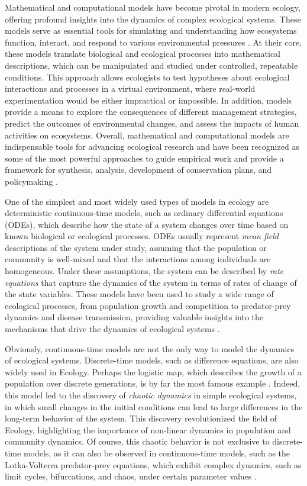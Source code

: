 Mathematical and computational models have become pivotal in modern ecology,
offering profound insights into the dynamics of complex ecological systems.
These models serve as essential tools for simulating and understanding how
ecosystems function, interact, and respond to various environmental pressures
\cite{HOCH19983}. At their core, these models translate biological and
ecological processes into mathematical descriptions, which can be manipulated
and studied under controlled, repeatable conditions. This approach allows
ecologists to test hypotheses about ecological interactions and processes in a
virtual environment, where real-world experimentation would be either
impractical or impossible. In addition, models provide a means to explore the
consequences of different management strategies, predict the outcomes of
environmental changes, and assess the impacts of human activities on
ecosystems. Overall, mathematical and computational models are indispensable
tools for advancing ecological research and have been recognized as some
of the most powerful approaches to guide empirical work and provide a framework
for synthesis, analysis, development of conservation plans, and policymaking
\cite{levin1992mathematics,Murray_book,sarkar2006biodiversity}.

One of the simplest and most widely used types of models in ecology are
deterministic continuous-time models, such as ordinary differential equations
(ODEs), which describe how the state of a system changes over time based on
known biological or ecological processes. ODEs usually represent \textit{mean
  field} descriptions of the system under study, assuming that the population
or community is well-mixed and that the interactions among individuals are
homogeneous. Under these assumptions, the system can be described by
\textit{rate equations} that capture the dynamics of the system in terms of
rates of change of the state variables. These models have been used to study a
wide range of ecological processes, from population growth and competition to
predator-prey dynamics and disease transmission, providing valuable insights
into the mechanisms that drive the dynamics of ecological systems
\cite{Murray_book}.

Obviously, continuous-time models are not the only way to model the dynamics of
ecological systems. Discrete-time models, such as difference equations, are
also widely used in Ecology. Perhaps the logistic map, which describes the
growth of a population over discrete generations, is by far the most famous
example \cite{May1974}. Indeed, this model led to the discovery of
\textit{chaotic dynamics} in simple ecological systems, in which small changes
in the initial conditions can lead to large differences in the long-term
behavior of the system. This discovery revolutionized the field of Ecology,
highlighting the importance of non-linear dynamics in population and community
dynamics. Of course, this chaotic behavior is not exclusive to discrete-time
models, as it can also be observed in continuous-time models, such as the
Lotka-Volterra predator-prey equations, which exhibit complex dynamics, such as
limit cycles, bifurcations, and chaos, under certain parameter values
\cite{Murray_book}.

